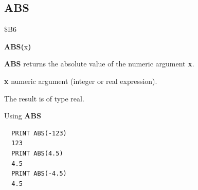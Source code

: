 \subsection{ABS}
\begin{description}[leftmargin=2cm,style=nextline]
\item [Token:] \$B6
\item [Format:] {\bf ABS(}x{\bf)}
\item [Usage:]  {\bf ABS} returns
                the absolute value of the numeric
                argument {\bf x}.

               {\bf x} numeric argument (integer or real expression).
\item [Remarks:] The result is of type real.
\item [Example:] Using {\bf ABS}

\begin{tcolorbox}[colback=black,coltext=white]
\verbatimfont{\codefont}
\begin{verbatim}
  PRINT ABS(-123)
  123
  PRINT ABS(4.5)
  4.5
  PRINT ABS(-4.5)
  4.5
\end{verbatim}
\end{tcolorbox}
\end{description}


\newpage
